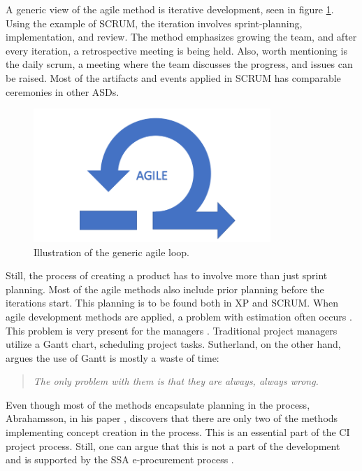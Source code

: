 A generic view of the agile method is iterative development, seen in figure \ref{fig:agile_iteration}. Using the example of SCRUM, the iteration involves sprint-planning, implementation, and review. The method emphasizes growing the team, and after every iteration, a retrospective meeting is being held. Also, worth mentioning is the daily scrum, a meeting where the team discusses the progress, and issues can be raised. Most of the artifacts and events applied in SCRUM has comparable ceremonies in other ASDs. 

\begin{figure}
    \centering
    \includegraphics[width=0.8\textwidth]{fig/agile_loop.png}
    \caption{Illustration of the generic agile loop.}
    \label{fig:agile_iteration}
\end{figure}

Still, the process of creating a product has to involve more than just sprint planning. Most of the agile methods also include prior planning before the iterations start. This planning is to be found both in XP and SCRUM. When agile development methods are applied, a problem with estimation often occurs \cite{lang2013cost}. This problem is very present for the managers \cite{dybaa2008empirical}. Traditional project managers utilize a Gantt chart, scheduling project tasks. Sutherland, on the other hand, argues the use of Gantt is mostly a waste of time:
\begin{quote}
    \textit{The only problem with them is that they are always, always wrong.}
\end{quote}
Even though most of the methods encapsulate planning in the process, Abrahamsson, in his paper \cite{abrahamsson2017agile}, discovers that there are only two of the methods implementing concept creation in the process. This is an essential part of the CI project process. Still, one can argue that this is not a part of the development and is supported by the SSA e-procurement process \cite{e-procurement-process}. 

